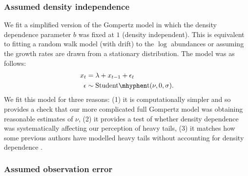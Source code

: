\subsubsection{Assumed density independence}\label{assumed-density-independence}

We fit a simplified version of the Gompertz model in which the density
dependence parameter $b$ was fixed at $1$ (density independent). This is
equivalent to fitting a random walk model (with drift) to the $\log$
abundances or assuming the growth rates are drawn from a stationary
distribution. The model was as follows:
\begin{align*}
x_t &= \lambda + x_{t-1} + \epsilon_t\\
\epsilon &\sim \mathrm{Student\mhyphen t}(\nu, 0, \sigma).
\end{align*}
We fit this model for three reasons: (1) it is computationally simpler and so
provides a check that our more complicated full Gompertz model was obtaining
reasonable estimates of $\nu$, (2) it provides a test of whether density
dependence was systematically affecting our perception of heavy tails, (3) it
matches how some previous authors have modelled heavy tails without accounting
for density dependence \citep{segura2013}.

\subsubsection{Assumed observation error}

